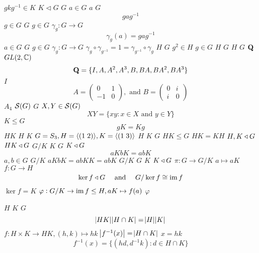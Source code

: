 \documentclass{article}
\begin{document}
$gkg^{-1}\in K$
$K\triangleleft G$
$G$
$a\in G$
$a$
$G$
\begin{equation*}
   gag^{-1}
   \end{equation*}
$g\in G$
$G$
$g\in G$
$\gamma_g:G\to G$
\begin{equation*}
   \gamma_g(a)=gag^{-1}
   \end{equation*}
$a\in G$
$G$
$g\in G$
$\gamma_g:G\to G$
$\gamma_g\circ\gamma_{g^{-1}}=1=\gamma_{g^{-1}}\circ\gamma_g$
$H$
$G$
$g^2\in H$
$g\in G$
$H$
$G$
$H$
$G$
$\operatorname{\textbf{Q}}$
$GL(2, \mathbb{C})$
\begin{equation*}
   \operatorname{\textbf{Q}}=\{I,A,A^2,A^3,B,BA,BA^2,BA^3\}
   \end{equation*}
$I$
\begin{equation*}
   A=
   \begin{pmatrix}
   0&1\\
   -1&0
   \end{pmatrix}, \text{ and }
   B=\begin{pmatrix}
   0&i\\
   i&0
     \end{pmatrix}
   \end{equation*}
$A_4$
$\mathcal{S}(G)$
$G$
$X,Y\in\mathcal{S}(G)$
\begin{equation*}
   XY=\{xy:x\in X\text{ and } y\in Y\}
   \end{equation*}
$K\le G$
\begin{equation*}
   gK=Kg
   \end{equation*}
$HK$
$H$
$K$
$G=S_3,H=\langle(1\;2)\rangle,K=\langle(1\;3)\rangle$
$H$
$K$
$G$
$HK\le G$
$HK=KH$
$H,K\triangleleft G$
$HK\triangleleft G$
$G/K$
$K$
$G$
$K\triangleleft G$
\begin{equation*}
   aKbK=abK
   \end{equation*}
$a,b\in G$
$G/K$
$aKbK=abKK=abK$
$G/K$
$G$
$K$
$K\triangleleft G$
$\pi:G\to G/K$
$a\mapsto aK$
$f:G\to H$
\begin{equation*}
   \ker f\triangleleft G\quad\text{ and }\quad G/\ker f\cong\operatorname{im} f
   \end{equation*}
$\ker f=K$
$\varphi:G/K\to\operatorname{im} f\le H,aK\mapsto f(a)$
$\varphi$
$H$
$K$
$G$
\begin{equation*}
   \abs{HK}\abs{H\cap K}=\abs{H}\abs{K}
   \end{equation*}
$f:H\times K\to HK,(h,k)\mapsto hk$
$\abs{f^{-1}(x)}=\abs{H\cap K}$
$x=hk$
\begin{equation*}
   f^{-1}(x)=\{(hd,d^{-1}k):d\in H\cap K\}
   \end{equation*}
\end{document}
